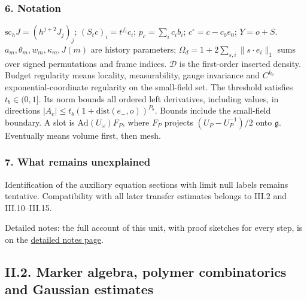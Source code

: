 \documentclass[
  letterpaper,
  11pt]{article}
\begin{document}
\subsubsection{6. Notation}\label{notation-1}

\(\mathrm{sc}_hJ=(h^{j+2}J_j)_j\); \((S_tc)_i=t^{f_i}c_i\);
\(p_c=\sum_ic_ib_i\); \(c^\circ=c-c_0e_0\); \(Y=o+S\).
\(a_m,\theta_m,w_m,\kappa_m,J(m)\) are history parameters;
\(\Omega_d=1+2\sum_{s,i}\lVert s\cdot e_i\rVert_1\) sums over signed
permutations and frame indices. \(\mathcal D\) is the first-order
inserted density. Budget regularity means locality, measurability, gauge
invariance and \(C^{k_b}\) exponential-coordinate regularity on the
small-field set. The threshold satisfies \(t_b\in(0,1]\). Its norm
bounds all ordered left derivatives, including values, in directions
\(\lvert A_e\rvert\le t_b(1+\mathrm{dist}(e_-,o))^{P_b}\). Bounds
include the small-field boundary. A slot is
\(\mathrm{Ad}(U_\omega)F_P\), where \(F_P\) projects
\((U_P-U_P^{-1})/2\) onto \(\mathfrak g\). Eventually means volume
first, then mesh.

\subsubsection{7. What remains
unexplained}\label{what-remains-unexplained-1}

Identification of the auxiliary equation sections with limit null labels
remains tentative. Compatibility with all later transfer estimates
belongs to III.2 and III.10--III.15.

Detailed notes: the full account of this unit, with proof sketches for
every step, is on the
\href{https://github.com/scottnarmstrong/yang-mills-informalization/blob/main/outline/notes/II-1.md}{detailed
notes page}.

\subsection{II.2. Marker algebra, polymer combinatorics and Gaussian
estimates}\label{ii.2.-marker-algebra-polymer-combinatorics-and-gaussian-estimates}
\end{document}
